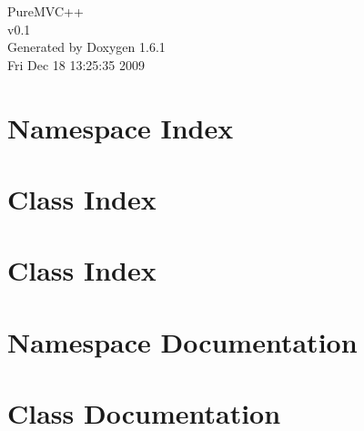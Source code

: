 \documentclass[a4paper]{book}
\begin{document}
\hypersetup{pageanchor=false}
\begin{titlepage}
\vspace*{7cm}
\begin{center}
{\Large PureMVC++ \\[1ex]\large v0.1 }\\
\vspace*{1cm}
{\large Generated by Doxygen 1.6.1}\\
\vspace*{0.5cm}
{\small Fri Dec 18 13:25:35 2009}\\
\end{center}
\end{titlepage}
\clearemptydoublepage
{}
\tableofcontents
\clearemptydoublepage
{}
\hypersetup{pageanchor=true}
\chapter{Namespace Index}

\chapter{Class Index}

\chapter{Class Index}

\chapter{Namespace Documentation}

\chapter{Class Documentation}





























\printindex
\end{document}
